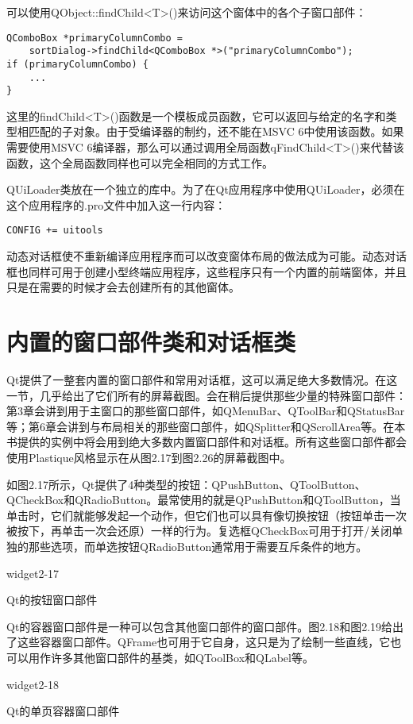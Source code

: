 \documentclass[11pt,oneside]{book}
\begin{document}
\begin{common-format}
可以使用QObject::findChild<T>()来访问这个窗体中的各个子窗口部件：
\begin{Verbatim}
QComboBox *primaryColumnCombo =
    sortDialog->findChild<QComboBox *>("primaryColumnCombo");
if (primaryColumnCombo) {
    ...
}
\end{Verbatim}

这里的findChild<T>()函数是一个模板成员函数，它可以返回与给定的名字和类型相匹配的子对象。由于受编译器的制约，还不能在MSVC 6中使用该函数。如果需要使用MSVC 6编译器，那么可以通过调用全局函数qFindChild<T>()来代替该函数，这个全局函数同样也可以完全相同的方式工作。

QUiLoader类放在一个独立的库中。为了在Qt应用程序中使用QUiLoader，必须在这个应用程序的.pro文件中加入这一行内容：
\begin{Verbatim}
CONFIG += uitools
\end{Verbatim}

动态对话框使不重新编译应用程序而可以改变窗体布局的做法成为可能。动态对话框也同样可用于创建小型终端应用程序，这些程序只有一个内置的前端窗体，并且只是在需要的时候才会去创建所有的其他窗体。


\section{内置的窗口部件类和对话框类}
Qt提供了一整套内置的窗口部件和常用对话框，这可以满足绝大多数情况。在这一节，几乎给出了它们所有的屏幕截图。会在稍后提供那些少量的特殊窗口部件：第3章会讲到用于主窗口的那些窗口部件，如QMenuBar、QToolBar和QStatusBar等；第6章会讲到与布局相关的那些窗口部件，如QSplitter和QScrollArea等。在本书提供的实例中将会用到绝大多数内置窗口部件和对话框。所有这些窗口部件都会使用Plastique风格显示在从图2.17到图2.26的屏幕截图中。

如图2.17所示，Qt提供了4种类型的按钮：QPushButton、QToolButton、QCheckBox和QRadioButton。最常使用的就是QPushButton和QToolButton，当单击时，它们就能够发起一个动作，但它们也可以具有像切换按钮（按钮单击一次被按下，再单击一次会还原）一样的行为。复选框QCheckBox可用于打开/关闭单独的那些选项，而单选按钮QRadioButton通常用于需要互斥条件的地方。
\begin{linefig}[0.8]{widget2-17}
\caption{Qt的按钮窗口部件}
\label{fig:widget2-17}
\end{linefig}

Qt的容器窗口部件是一种可以包含其他窗口部件的窗口部件。图2.18和图2.19给出了这些容器窗口部件。QFrame也可用于它自身，这只是为了绘制一些直线，它也可以用作许多其他窗口部件的基类，如QToolBox和QLabel等。
\begin{linefig}[0.8]{widget2-18}
\caption{Qt的单页容器窗口部件}
\label{fig:widget2-18}
\end{linefig}


\end{common-format}
\end{document}
